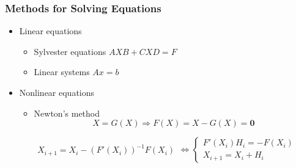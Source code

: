 \documentclass[aspectratio=169,xcolor=table]{beamer}
\begin{document}
\begin{frame}[fragile]
   
  \frametitle{Methods for Solving Equations}
 
\begin{itemize}
    \item Linear equations
    \begin{itemize}
        \item Sylvester equations $AXB + CXD = F$
        \item Linear systems $Ax=b$
    \end{itemize}
    \item Nonlinear equations
    \begin{itemize}
        \item Newton's method \\
                $$X = G(X) \Rightarrow F(X) = X - G(X) = \mathbf{0}$$
                \begin{center}
                \(
                \left.
                \begin{array}{l}
                X_{i+1} = X_i - (F'(X_i))^{-1}F(X_i)
                \end{array}
                \right.
                \iff
                \left\{
                \begin{array}{l}
                F'(X_i)H_i = - F(X_i) \\
                X_{i+1} = X_i + H_i
                \end{array}
                \right.
                \)
                \end{center}
    \end{itemize}
\end{itemize}
\end{frame}
\end{document}
